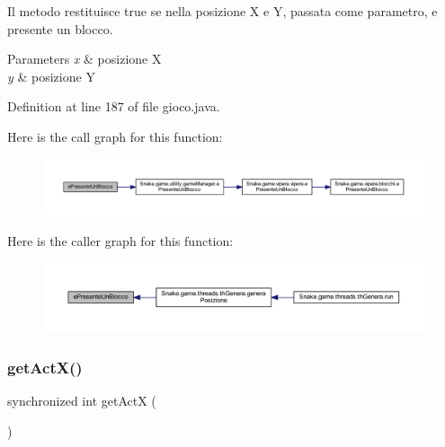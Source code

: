 Il metodo restituisce true se nella posizione X e Y, passata come parametro, e\textquotesingle{} presente un blocco. 


\begin{DoxyParams}{Parameters}
{\em x} & posizione X \\
\hline
{\em y} & posizione Y \\
\hline
\end{DoxyParams}


Definition at line 187 of file gioco.\+java.

Here is the call graph for this function\+:
\nopagebreak
\begin{figure}[H]
\begin{center}
\leavevmode
\includegraphics[width=350pt]{class_snake_1_1game_1_1gioco_a0b9510c56170e691e67ab6308a4bd1f6_cgraph}
\end{center}
\end{figure}
Here is the caller graph for this function\+:
\nopagebreak
\begin{figure}[H]
\begin{center}
\leavevmode
\includegraphics[width=350pt]{class_snake_1_1game_1_1gioco_a0b9510c56170e691e67ab6308a4bd1f6_icgraph}
\end{center}
\end{figure}
\mbox{\label{class_snake_1_1game_1_1gioco_a0176af97fc1e2e7714a82049ab9a7069}} 
\subsubsection{\texorpdfstring{get\+Act\+X()}{getActX()}}
{\footnotesize\ttfamily synchronized int get\+ActX (\begin{DoxyParamCaption}{ }\end{DoxyParamCaption})}



